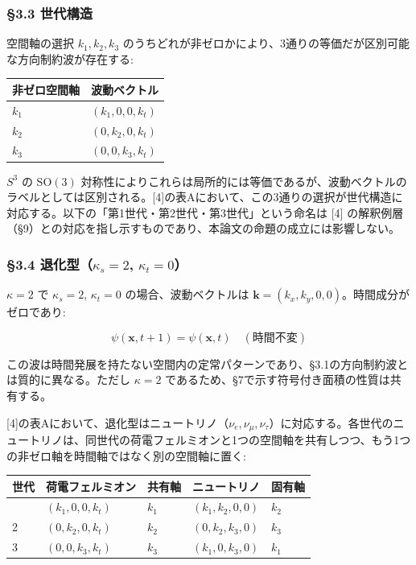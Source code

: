\documentclass[
  a4paper,11pt]{ltjsarticle}
\newcounter{none}
\theoremstyle{definition}
\theoremstyle{remark}
\begin{document}
\subsubsection{§3.3 世代構造}\label{ux4e16ux4ee3ux69cbux9020}

空間軸の選択 \(k_1, k_2, k_3\)
のうちどれが非ゼロかにより、3通りの等価だが区別可能な方向制約波が存在する:

{\def\LTcaptype{none} %
\begin{longtable}[]{@{}ll@{}}
\toprule\noalign{}
非ゼロ空間軸 & 波動ベクトル \\
\midrule\noalign{}
\endhead
\bottomrule\noalign{}
\endlastfoot
\(k_1\) & \((k_1, 0, 0, k_t)\) \\
\(k_2\) & \((0, k_2, 0, k_t)\) \\
\(k_3\) & \((0, 0, k_3, k_t)\) \\
\end{longtable}
}

\(S^3\) の \(\mathrm{SO}(3)\)
対称性によりこれらは局所的には等価であるが、波動ベクトルのラベルとしては区別される。{[}4{]}の表Aにおいて、この3通りの選択が世代構造に対応する。以下の「第1世代・第2世代・第3世代」という命名は
{[}4{]}
の解釈例層（§9）との対応を指し示すものであり、本論文の命題の成立には影響しない。

\subsubsection{\texorpdfstring{§3.4 退化型（\(\kappa_s = 2\),
\(\kappa_t = 0\)）}{§3.4 退化型（\textbackslash kappa\_s = 2, \textbackslash kappa\_t = 0）}}\label{ux9000ux5316ux578bkappa_s-2-kappa_t-0}

\(\kappa = 2\) で \(\kappa_s = 2\), \(\kappa_t = 0\)
の場合、波動ベクトルは
\(\mathbf{k} = (k_x, k_y, 0, 0)\)。時間成分がゼロであり:

\[\psi(\mathbf{x}, t+1) = \psi(\mathbf{x}, t) \quad (\text{時間不変})\]

この波は時間発展を持たない空間内の定常パターンであり、§3.1の方向制約波とは質的に異なる。ただし
\(\kappa = 2\) であるため、§7で示す符号付き面積の性質は共有する。

{[}4{]}の表Aにおいて、退化型はニュートリノ（\(\nu_e, \nu_\mu, \nu_\tau\)）に対応する。各世代のニュートリノは、同世代の荷電フェルミオンと1つの空間軸を共有しつつ、もう1つの非ゼロ軸を時間軸ではなく別の空間軸に置く:

{\def\LTcaptype{none} %
\begin{longtable}[]{@{}lllll@{}}
\toprule\noalign{}
世代 & 荷電フェルミオン & 共有軸 & ニュートリノ & 固有軸 \\
\midrule\noalign{}
\endhead
\bottomrule\noalign{}
\endlastfoot
1 & \((k_1, 0, 0, k_t)\) & \(k_1\) & \((k_1, k_2, 0, 0)\) & \(k_2\) \\
2 & \((0, k_2, 0, k_t)\) & \(k_2\) & \((0, k_2, k_3, 0)\) & \(k_3\) \\
3 & \((0, 0, k_3, k_t)\) & \(k_3\) & \((k_1, 0, k_3, 0)\) & \(k_1\) \\
\end{longtable}
}
\end{document}

